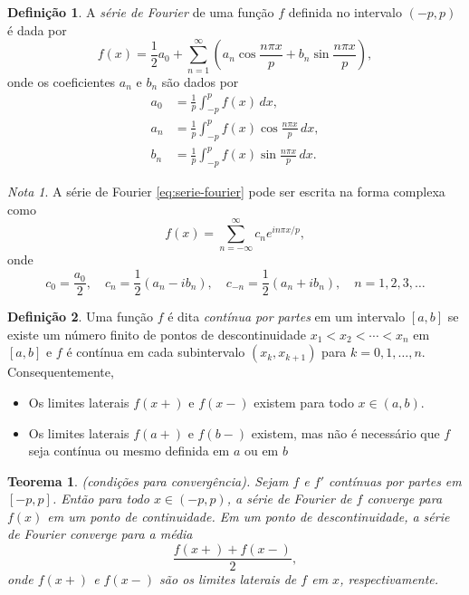 \documentclass{article}
\theoremstyle{plain}
\newtheorem{thm}{Teorema}[section]
\theoremstyle{definition}
\newtheorem{defn}{Definição}[section]
\theoremstyle{remark}
\newtheorem*{rem}{Nota}
\begin{document}
\begin{defn}
    A \emph{série de Fourier} de uma função \(f\) definida no intervalo \((-p,p)\) é dada por
    \begin{equation}\label{eq:serie-fourier}
        f(x) = \frac{1}{2}a_0 + \sum_{n=1}^{\infty} \left( a_n \cos\frac{n\pi x}{p} + b_n \sin\frac{n\pi x}{p} \right),
    \end{equation}
    onde os coeficientes \(a_n\) e \(b_n\) são dados por
    \begin{align}
        a_0 &= \frac{1}{p} \int_{-p}^{p} f(x) \, dx, \\
        a_n &= \frac{1}{p} \int_{-p}^{p} f(x) \cos\frac{n\pi x}{p} \, dx, \\
        b_n &= \frac{1}{p} \int_{-p}^{p} f(x) \sin\frac{n\pi x}{p} \, dx.
    \end{align}
\end{defn}

\begin{rem}
    A série de Fourier \eqref{eq:serie-fourier} pode ser escrita na forma complexa como
    \begin{equation}\label{eq:serie-fourier-complexa}
        f(x) = \sum_{n=-\infty}^{\infty} c_n e^{i n \pi x / p},
    \end{equation}
    \noindent onde
    \begin{equation}
        c_0 = \frac{a_0}{2}, \quad c_n = \frac{1}{2}(a_n - i b_n), \quad c_{-n} = \frac{1}{2}(a_n + i b_n), \quad n=1,2,3,\ldots
    \end{equation}
\end{rem}

\begin{defn}
    Uma função \(f\) é dita \emph{contínua por partes} em um intervalo \([a,b]\) se existe um número finito de pontos de descontinuidade \(x_1<x_2<\cdots<x_n\) em \([a,b]\) e \(f\) é contínua em cada subintervalo \((x_k, x_{k+1})\) para \(k=0,1,\ldots,n\). Consequentemente,
    \begin{itemize}
        \item Os limites laterais \(f(x+)\) e \(f(x-)\) existem para todo \(x \in (a,b)\).
        \item Os limites laterais \(f(a+)\) e \(f(b-)\) existem, mas não é necessário que \(f\) seja contínua ou mesmo definida em \(a\) ou em \(b\)
    \end{itemize}
\end{defn}

\begin{thm} (condições para convergência).
    Sejam \(f\) e \(f'\) contínuas por partes em \([-p,p]\). Então para todo \(x \in (-p,p)\), a série de Fourier de \(f\) converge para \(f(x)\) em um ponto de continuidade. Em um ponto de descontinuidade, a série de Fourier converge para a média
    \begin{equation*}
        \frac{f(x+) + f(x-)}{2},
    \end{equation*}
    \noindent onde \(f(x+)\) e \(f(x-)\) são os limites laterais de \(f\) em \(x\), respectivamente.
\end{thm}
\end{document}
